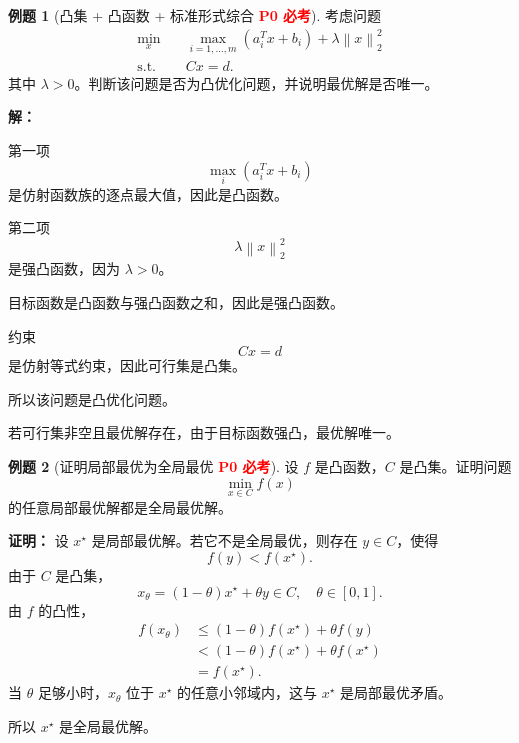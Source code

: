 \documentclass[11pt,a4paper]{ctexart}
\newcommand{\st}{\text{s.t.}}
\newcommand{\norm}[1]{\left\lVert #1 \right\rVert}
\newcommand{\Pzero}{\textcolor{red}{\textbf{P0 必考}}}
\theoremstyle{definition}
\newtheorem{example}{例题}[section]
\theoremstyle{plain}
\theoremstyle{remark}
\begin{document}
\begin{example}[凸集 + 凸函数 + 标准形式综合 \Pzero]
考虑问题
\[
\begin{aligned}
    \min_x\quad &
    \max_{i=1,\dots,m}(a_i^Tx+b_i)
    +
    \lambda\norm{x}_2^2\\
    \st\quad &
    Cx=d.
\end{aligned}
\]
其中 $\lambda>0$。判断该问题是否为凸优化问题，并说明最优解是否唯一。

\textbf{解：}

第一项
\[
    \max_i(a_i^Tx+b_i)
\]
是仿射函数族的逐点最大值，因此是凸函数。

第二项
\[
    \lambda\norm{x}_2^2
\]
是强凸函数，因为 $\lambda>0$。

目标函数是凸函数与强凸函数之和，因此是强凸函数。

约束
\[
    Cx=d
\]
是仿射等式约束，因此可行集是凸集。

所以该问题是凸优化问题。

若可行集非空且最优解存在，由于目标函数强凸，最优解唯一。
\end{example}

\begin{example}[证明局部最优为全局最优 \Pzero]
设 $f$ 是凸函数，$C$ 是凸集。证明问题
\[
    \min_{x\in C} f(x)
\]
的任意局部最优解都是全局最优解。

\textbf{证明：}
设 $x^\star$ 是局部最优解。若它不是全局最优，则存在 $y\in C$，使得
\[
    f(y)<f(x^\star).
\]
由于 $C$ 是凸集，
\[
    x_\theta=(1-\theta)x^\star+\theta y\in C,
    \quad \theta\in[0,1].
\]
由 $f$ 的凸性，
\[
\begin{aligned}
    f(x_\theta)
    &\le
    (1-\theta)f(x^\star)+\theta f(y)\\
    &<
    (1-\theta)f(x^\star)+\theta f(x^\star)\\
    &=
    f(x^\star).
\end{aligned}
\]
当 $\theta$ 足够小时，$x_\theta$ 位于 $x^\star$ 的任意小邻域内，这与 $x^\star$ 是局部最优矛盾。

所以 $x^\star$ 是全局最优解。
\end{example}
\end{document}
